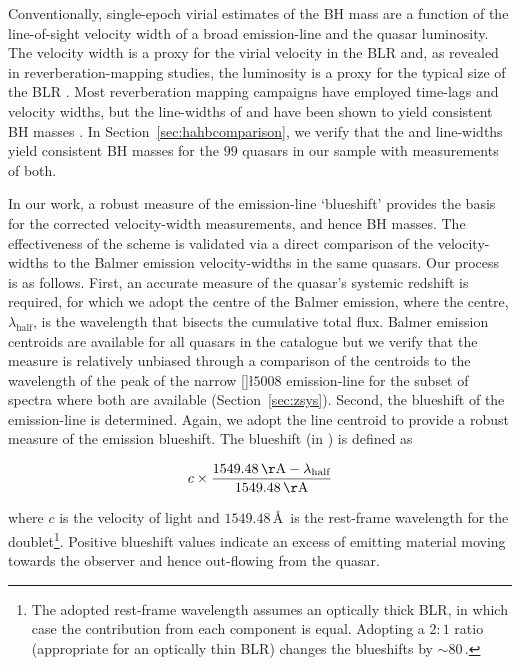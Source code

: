 Conventionally, single-epoch virial estimates of the BH mass are a function of the line-of-sight velocity width of a broad emission-line and the quasar luminosity.
The velocity width is a proxy for the virial velocity in the BLR and, as revealed in reverberation-mapping studies, the luminosity is a proxy for the typical size of the BLR \citep[the $R_{\text{BLR}}-L$ relation; e.g.][]{kaspi00,kaspi07}.
Most reverberation mapping campaigns have employed \hb time-lags and velocity widths, but the line-widths of \ha and  have been shown to yield consistent BH masses \citep[e.g.][]{mclure02,greene05b,onken08,shen08,wang09,rafiee11,mejia-restrepo16}.
In Section~\ref{sec:hahbcomparison}, we verify that the \ha and \hb line-widths yield consistent BH masses for the $99$ quasars in our sample with measurements of both.

In our work, a robust measure of the  emission-line `blueshift' provides the basis for the corrected  velocity-width measurements, and hence BH masses.
The effectiveness of the scheme is validated via a direct comparison of the  velocity-widths to the Balmer emission velocity-widths in the same quasars.
Our process is as follows.
First, an accurate measure of the quasar's systemic redshift is required, for which we adopt the centre of the Balmer emission, where the centre, $\lambda_{\text{half}}$, is the wavelength that bisects the cumulative total flux.
Balmer emission centroids are available for all quasars in the catalogue but we verify that the measure is relatively unbiased through a comparison of the centroids to the wavelength of the peak of the narrow []\l$5008$ emission-line for the subset of spectra where both are available (Section~\ref{sec:zsys}).
Second, the blueshift of the  emission-line is determined.
Again, we adopt the line centroid to provide a robust measure of the  emission blueshift.
The blueshift (in \kms) is defined as

\begingroup\makeatletter{}\check@mathfonts
\begin{eqnarray}
\label{eq:civblueshift}
c \times \frac{1549.48\,{\mathrm \AA}-\lambda_{\text{half}}}{1549.48\,{\mathrm \AA}}
\end{eqnarray}
\endgroup

\noindent where $c$ is the velocity of light and $1549.48$\,\AA\, is the rest-frame wavelength for the  doublet\footnote{The adopted  rest-frame wavelength assumes an optically thick BLR, in which case the contribution from each component is equal. Adopting a $2:1$ ratio (appropriate for an optically thin BLR) changes the blueshifts by $\sim80$\,\kms.}.
Positive blueshift values indicate an excess of emitting material moving towards the observer and hence out-flowing from the quasar.

